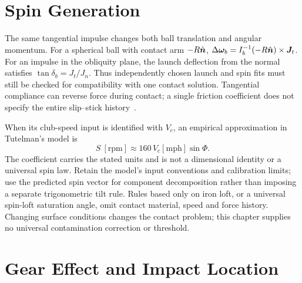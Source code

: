\section{Spin Generation}
\label{sec:spingen}

The same tangential impulse changes both ball translation and angular momentum.
For a spherical ball with contact arm $-R\hat{\bm{n}}$,
$\Delta\boldsymbol\omega_b=I_b^{-1}(-R\hat{\bm{n}})\times\bm{J}_t$.
For an impulse in the obliquity plane, the launch deflection from the normal satisfies $\tan\delta_b=J_t/J_n$.
Thus independently chosen launch and spin fits must still be checked for compatibility with one contact solution.
Tangential compliance can reverse force during contact; a single friction coefficient does not specify the entire slip--stick history~\cite{mdpifriction,crossoblique}.

When its club-speed input is identified with $V_c$, an empirical approximation in Tutelman's model is~\cite{tutelman3d}
\begin{equation}
\label{eq:spinrate}
S\ [\mathrm{rpm}]\approx160\,V_c[\mathrm{mph}]\sin\Phi.
\end{equation}
The coefficient carries the stated units and is not a dimensional identity or a universal spin law.
Retain the model's input conventions and calibration limits; use the predicted spin vector for component decomposition rather than imposing a separate trigonometric tilt rule.
Rules based only on iron loft, or a universal spin-loft saturation angle, omit contact material, speed and force history.
Changing surface conditions changes the contact problem; this chapter supplies no universal contamination correction or threshold.
\nocite{trackmanspinloft}

\section{Gear Effect and Impact Location}
\label{sec:gear}

